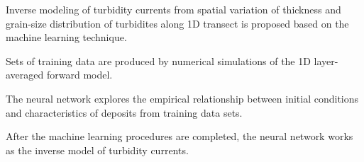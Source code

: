 
\begin{keypoints}
\item Inverse modeling of turbidity currents from spatial variation of thickness and grain-size distribution of turbidites along 1D transect is proposed based on the machine learning technique.
\item Sets of training data are produced by numerical simulations of the 1D layer-averaged forward model.
\item The neural network explores the empirical relationship between initial conditions and characteristics of deposits from training data sets.
\item After the machine learning procedures are completed, the neural network works as the inverse model of turbidity currents.
\end{keypoints}
